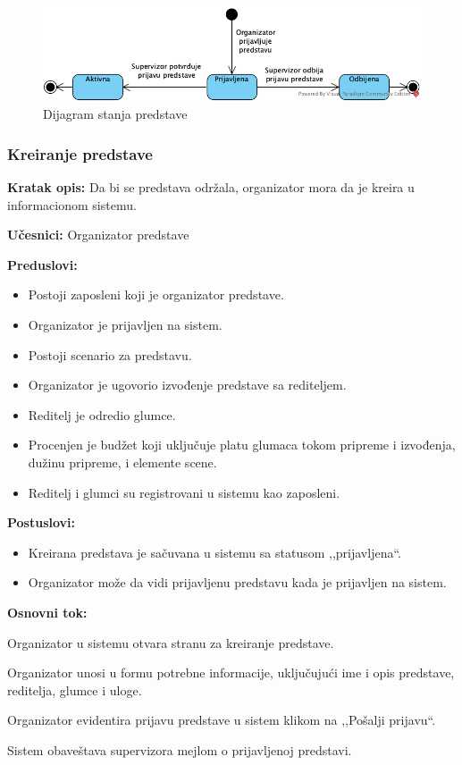 \documentclass[a4paper]{article}
\begin{document}
\begin{figure}[H]
  \begin{center}
      \includegraphics[width=120mm]{../images/state_predstava.png}
  \end{center}
  \caption{Dijagram stanja predstave}
  \label{state_predstava}
\end{figure}

\subsubsection{Kreiranje predstave} \label{Kreiranje predstave}
\noindent\textbf{Kratak opis:} Da bi se predstava održala, organizator mora da je kreira u informacionom sistemu. 

\noindent\textbf{Učesnici:} Organizator predstave

\noindent\textbf{Preduslovi:}
  \begin{itemize}
    \item Postoji zaposleni koji je organizator predstave.
    \item Organizator je prijavljen na sistem.
    \item Postoji scenario za predstavu.
    \item Organizator je ugovorio izvođenje predstave sa rediteljem.
    \item Reditelj je odredio glumce.
    \item Procenjen je budžet koji uključuje platu glumaca tokom pripreme i izvođenja, dužinu pripreme, i elemente scene.
    \item Reditelj i glumci su registrovani u sistemu kao zaposleni.
  \end{itemize}

\noindent\textbf{Postuslovi:} 
  \begin{itemize}
    \item Kreirana predstava je sačuvana u sistemu sa statusom ,,prijavljena``.
    \item Organizator može da vidi prijavljenu predstavu kada je prijavljen na sistem.
  \end{itemize}

\noindent\textbf{Osnovni tok:}
  \begin{legal}
    \item Organizator u sistemu otvara stranu za kreiranje predstave.
    \item Organizator unosi u formu potrebne informacije, uključujući ime i opis predstave, reditelja, glumce i uloge. 
    \item Organizator evidentira prijavu predstave u sistem klikom na ,,Pošalji prijavu``. 
    \item Sistem obaveštava supervizora mejlom o prijavljenoj predstavi.
  \end{legal}
\end{document}
